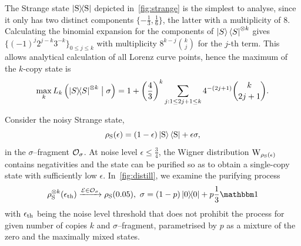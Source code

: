 \documentclass[pra,
aps,
twocolumn,
superscriptaddress,
groupedaddress,
nofootinbib,
reprint
]{revtex4-1}
\begin{document}
The Strange state $\ketbra{\rm{S}}$ depicted in~\cref{fig:strange} is the simplest to analyse, since it only has two distinct components $\{ -\frac{1}{3}, \frac{1}{6} \}$, the latter with a multiplicity of 8.
Calculating the binomial expansion for the components of $\ket{S}\bra{S}^{\otimes k}$ gives $\{(-1)^j 2^{j-k} 3^{-k}\}_{0 \leq j \leq k}$ with multiplicity $8^{k-j} \binom{k}{j}$ for the $j$-th term.
This allows analytical calculation of all Lorenz curve points, hence the maximum of the $k$-copy state is
\begin{equation}\label{eq:Skmax}
    \max_k{L_k \left( \ketbra{S}^{\otimes k} \bigm| \sigma \right)} = 1 + \left(\frac{4}{3}\right)^k \sum\limits_{j: 1 \leq 2j+1 \leq k} 4^{-(2j+1)} \binom{k}{2j+1}.
\end{equation}

Consider the noisy Strange state,
\begin{equation}
    \rho_{\rm{S}}(\epsilon) = (1 - \epsilon) \ket{\rm{S}}\bra{\rm{S}} + \epsilon \sigma,
\end{equation}
in the $\sigma$--fragment $\mathcal{O}_\sigma$.
At noise level $\epsilon \leq \frac{3}{4}$, the Wigner distribution $\W{\rho_{\rm{S}}(\epsilon)}$ contains negativities and the state can be purified so as to obtain a single-copy state with sufficiently low $\epsilon$.
In~\cref{fig:distill}, we examine the purifying process 
\begin{equation}\label{eq:purify}
    \rho_{\rm{S}}^{\otimes k}(\epsilon_{\rm{th}}) \xrightarrow{\E \in \O_\sigma} \rho_{\rm{S}}(0.05),\ \sigma = (1-p)\ketbra{0} + p \frac{1}{3}\id
\end{equation}
with $\epsilon_{\rm{th}}$ being the noise level threshold that does not prohibit the process for given number of copies $k$ and $\sigma$--fragment, parametrised by $p$ as a mixture of the zero and the maximally mixed states.
\end{document}
